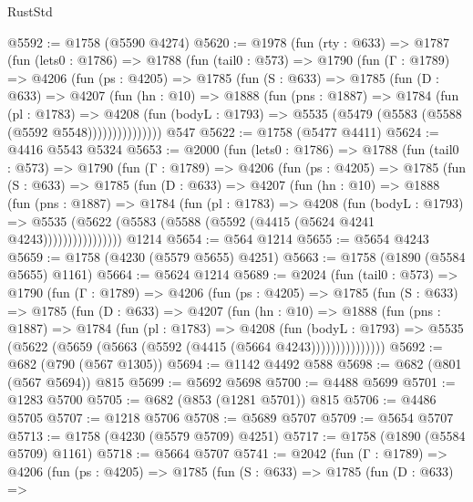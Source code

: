 \begin{lexlean}{RustStd}
\begin{coremodule}
{\begin{coremodule}
{{{{{{{{{{{{{{{@5592 := @1758 (@5590 @4274)
@5620 := @1978
    (fun (rty : @633) =>
    @1787
      (fun (lets0 : @1786) =>
      @1788
        (fun (tail0 : @573) =>
        @1790
          (fun (Γ : @1789) =>
          @4206
            (fun (ps : @4205) =>
            @1785
              (fun (S : @633) =>
              @1785
                (fun (D : @633) =>
                @4207
                  (fun (hn : @10) =>
                  @1888
                    (fun (pns : @1887) =>
                    @1784
                      (fun (pl : @1783) =>
                      @4208
                        (fun (bodyL : @1793) =>
                        @5535 (@5479 (@5583 (@5588 (@5592 @5548)))))))))))))))
    @547
@5622 := @1758 (@5477 @4411)
@5624 := @4416 @5543 @5324
@5653 := @2000
    (fun (lets0 : @1786) =>
    @1788
      (fun (tail0 : @573) =>
      @1790
        (fun (Γ : @1789) =>
        @4206
          (fun (ps : @4205) =>
          @1785
            (fun (S : @633) =>
            @1785
              (fun (D : @633) =>
              @4207
                (fun (hn : @10) =>
                @1888
                  (fun (pns : @1887) =>
                  @1784
                    (fun (pl : @1783) =>
                    @4208
                      (fun (bodyL : @1793) =>
                      @5535 (@5622 (@5583 (@5588 (@5592 (@4415 (@5624 @4241 @4243))))))))))))))))
    @1214
@5654 := @564 @1214
@5655 := @5654 @4243
@5659 := @1758 (@4230 (@5579 @5655) @4251)
@5663 := @1758 (@1890 (@5584 @5655) @1161)
@5664 := @5624 @1214
@5689 := @2024
    (fun (tail0 : @573) =>
    @1790
      (fun (Γ : @1789) =>
      @4206
        (fun (ps : @4205) =>
        @1785
          (fun (S : @633) =>
          @1785
            (fun (D : @633) =>
            @4207
              (fun (hn : @10) =>
              @1888
                (fun (pns : @1887) =>
                @1784
                  (fun (pl : @1783) =>
                  @4208
                    (fun (bodyL : @1793) =>
                    @5535 (@5622 (@5659 (@5663 (@5592 (@4415 (@5664 @4243)))))))))))))))
@5692 := @682 (@790 (@567 @1305))
@5694 := @1142 @4492 @588
@5698 := @682 (@801 (@567 @5694)) @815
@5699 := @5692 @5698
@5700 := @4488 @5699
@5701 := @1283 @5700
@5705 := @682 (@853 (@1281 @5701)) @815
@5706 := @4486 @5705
@5707 := @1218 @5706
@5708 := @5689 @5707
@5709 := @5654 @5707
@5713 := @1758 (@4230 (@5579 @5709) @4251)
@5717 := @1758 (@1890 (@5584 @5709) @1161)
@5718 := @5664 @5707
@5741 := @2042
    (fun (Γ : @1789) =>
    @4206
      (fun (ps : @4205) =>
      @1785
        (fun (S : @633) =>
        @1785
          (fun (D : @633) =>
}}}}}}}}}}}}}}}
\end{coremodule}}
\end{coremodule}
\end{lexlean}
